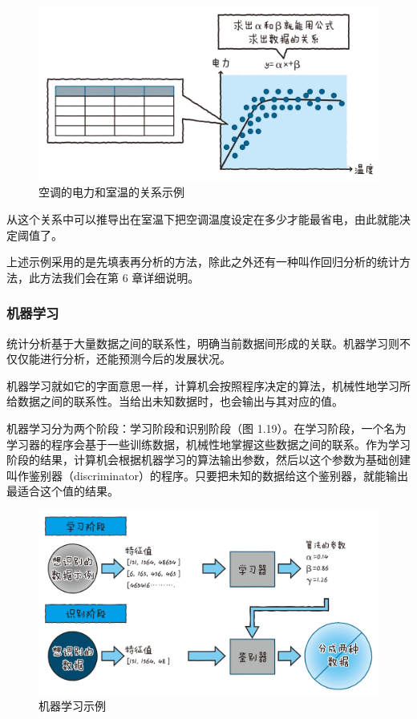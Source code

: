 \documentclass[12pt,UTF8]{ctexbook}
\begin{document}
\begin{figure}[htbp]
	\centering
	\includegraphics[width=1\linewidth]{18}
	\caption{空调的电力和室温的关系示例}
	\label{fig:1}
\end{figure}

从这个关系中可以推导出在室温下把空调温度设定在多少才能最省电，由此就能决定阈值了。

上述示例采用的是先填表再分析的方法，除此之外还有一种叫作回归分析的统计方法，此方法我们会在第 6 章详细说明。

\subsubsection{机器学习}

统计分析基于大量数据之间的联系性，明确当前数据间形成的关联。机器学习则不仅仅能进行分析，还能预测今后的发展状况。

机器学习就如它的字面意思一样，计算机会按照程序决定的算法，机械性地学习所给数据之间的联系性。当给出未知数据时，也会输出与其对应的值。

机器学习分为两个阶段：学习阶段和识别阶段（图 1.19）。在学习阶段，一个名为学习器的程序会基于一些训练数据，机械性地掌握这些数据之间的联系。作为学习阶段的结果，计算机会根据机器学习的算法输出参数，然后以这个参数为基础创建叫作鉴别器（discriminator）的程序。只要把未知的数据给这个鉴别器，就能输出最适合这个值的结果。

\begin{figure}[htbp]
	\centering
	\includegraphics[width=1\linewidth]{19}
	\caption{机器学习示例}
	\label{fig:1}
\end{figure}
\end{document}
